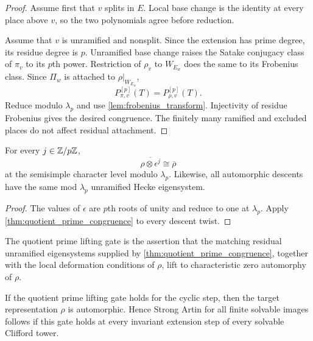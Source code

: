 \begin{proof}
Assume first that \(v\) splits in \(E\). Local base change is the identity at every place above \(v\), so the two polynomials agree before reduction.

Assume that \(v\) is unramified and nonsplit. Since the extension has prime degree, its residue degree is \(p\). Unramified base change raises the Satake conjugacy class of \(\pi_v\) to its \(p\)th power. Restriction of \(\rho_v\) to \(W_{E_w}\) does the same to its Frobenius class. Since \(\Pi_w\) is attached to \(\rho|_{W_{E_w}}\),
\[
P_{\pi,v}^{[p]}(T)
=
P_{\rho,v}^{[p]}(T).
\]
Reduce modulo \(\lambda_p\) and use \cref{lem:frobenius_transform}. Injectivity of residue Frobenius gives the desired congruence. The finitely many ramified and excluded places do not affect residual attachment.
\end{proof}

\begin{corollary}\label{cor:twists_collapse_residually}
For every \(j\in\mathbb Z/p\mathbb Z\),
\[
\overline{\rho\otimes\epsilon^j}
\cong
\overline\rho
\]
at the semisimple character level modulo \(\lambda_p\). Likewise, all automorphic descents have the same mod \(\lambda_p\) unramified Hecke eigensystem.
\end{corollary}

\begin{proof}
The values of \(\epsilon\) are \(p\)th roots of unity and reduce to one at \(\lambda_p\). Apply \cref{thm:quotient_prime_congruence} to every descent twist.
\end{proof}

\begin{definition}\label{def:quotient_prime_lifting}
The quotient prime lifting gate is the assertion that the matching residual unramified eigensystems supplied by \cref{thm:quotient_prime_congruence}, together with the local deformation conditions of \(\rho\), lift to characteristic zero automorphy of \(\rho\).
\end{definition}

\begin{theorem}\label{thm:quotient_prime_reduction}
If the quotient prime lifting gate holds for the cyclic step, then the target representation \(\rho\) is automorphic. Hence Strong Artin for all finite solvable images follows if this gate holds at every invariant extension step of every solvable Clifford tower.
\end{theorem}

